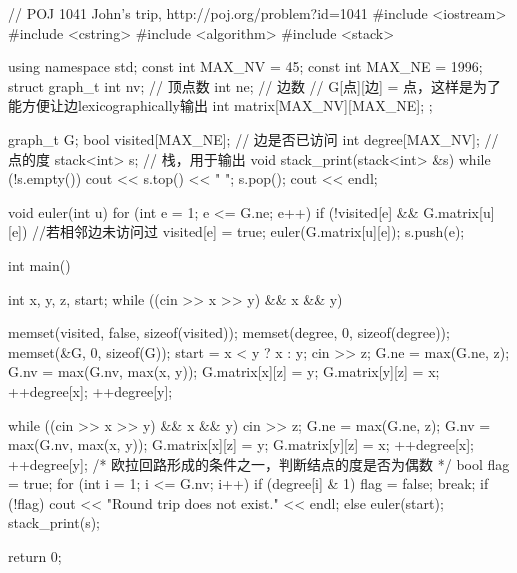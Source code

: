 \begin{Codex}[label=round_trip.cpp]
    // POJ 1041 John's trip, http://poj.org/problem?id=1041
    #include <iostream>
    #include <cstring>
    #include <algorithm>
    #include <stack>

    using namespace std;
    const int MAX_NV = 45;
    const int MAX_NE = 1996;
    struct graph_t {
        int nv; // 顶点数
        int ne; // 边数
        // G[点][边] = 点，这样是为了能方便让边lexicographically输出
        int matrix[MAX_NV][MAX_NE];
    };

    graph_t G;
    bool visited[MAX_NE];  // 边是否已访问
    int degree[MAX_NV];    // 点的度
    stack<int> s;  // 栈，用于输出
    void stack_print(stack<int> &s) {
        while (!s.empty()) {
            cout << s.top() << " ";
            s.pop();
        }
        cout << endl;
    }

    void euler(int u) {
        for (int e = 1; e <= G.ne; e++) {
            if (!visited[e] && G.matrix[u][e]) { //若相邻边未访问过
                visited[e] = true;
                euler(G.matrix[u][e]);
                s.push(e);
            }
        }
    }

    int main() {
        int x, y, z, start;
        while ((cin >> x >> y) && x && y) {
            memset(visited, false, sizeof(visited));
            memset(degree, 0, sizeof(degree));
            memset(&G, 0, sizeof(G));
            start = x < y ? x : y;
            cin >> z;
            G.ne = max(G.ne, z);
            G.nv = max(G.nv, max(x, y));
            G.matrix[x][z] = y;
            G.matrix[y][z] = x;
            ++degree[x];
            ++degree[y];

            while ((cin >> x >> y) && x && y) {
                cin >> z;
                G.ne = max(G.ne, z);
                G.nv = max(G.nv, max(x, y));
                G.matrix[x][z] = y;
                G.matrix[y][z] = x;
                ++degree[x];
                ++degree[y];
            }
            /* 欧拉回路形成的条件之一，判断结点的度是否为偶数 */
            bool flag = true;
            for (int i = 1; i <= G.nv; i++) {
                if (degree[i] & 1) {
                    flag = false;
                    break;
                }
            }
            if (!flag) {
                cout << "Round trip does not exist." << endl;
            } else {
                euler(start);
                stack_print(s);
            }
        }
        return 0;
    }
\end{Codex}


